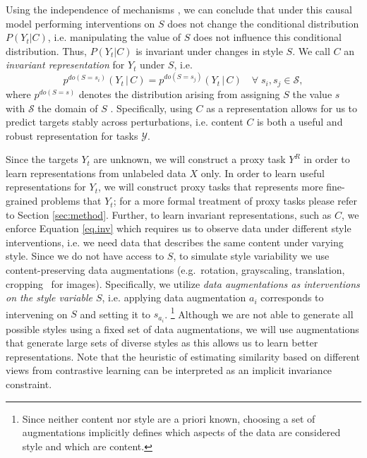 \documentclass{article}
\begin{document}
Using the independence of mechanisms \citep{peters2017elements}, we can conclude that under this causal model performing interventions on $S$ does not change the conditional distribution $P(Y_t\vert C)$, 
i.e. manipulating the value of $S$ does not influence this conditional distribution.
Thus, $P(Y_t\vert C)$ is invariant under changes in style $S$.
We call $C$ an \emph{invariant representation} for $Y_{t}$ under $S$, i.e.
\begin{equation}
    p^{do(S = s_{i})}(Y_{t}\,\vert\,C) = p^{do(S = s_{j})}(Y_{t}\,\vert\,C) \quad \forall \; s_{i}, s_{j}\in\mathcal{S}, \label{eq.inv}
\end{equation}
where $p^{do(S=s)}$ denotes the distribution arising from assigning $S$ the value $s$ with $\mathcal{S}$ the domain of $S$ \citep{pearl2009causality}.
Specifically, using $C$ as a representation allows for us to predict targets stably across perturbations, i.e. content $C$ is both a useful and robust representation for tasks $\mathcal{Y}$.

Since the targets $Y_{t}$ are unknown, we will construct a proxy task $Y^{R}$ in order to learn representations from unlabeled data $X$ only.
In order to learn useful representations for $Y_{t}$, we will construct proxy tasks that represents more fine-grained problems that $Y_{t}$; for a more formal treatment of proxy tasks please refer to Section \ref{sec:method}.
Further, to learn invariant representations, such as $C$, we enforce Equation \ref{eq.inv} which requires us to observe data under different style interventions, i.e. we need data that describes the same content under varying style. 
Since we do not have access to $S$, to simulate style variability we use content-preserving data augmentations  (e.g.\ rotation, grayscaling, translation, cropping \ for images).
Specifically, we utilize \emph{data augmentations as interventions on the style variable $S$}, i.e. applying data augmentation $a_{i}$ corresponds to intervening on $S$ and setting it to $s_{a_{i}}$. \footnote{Since neither content nor style are a priori known, choosing a set of augmentations implicitly defines which aspects of the data are considered style and which are content.}
Although we are not able to generate all possible styles using a fixed set of data augmentations, we will use augmentations that generate large sets of diverse styles as this allows us to learn better representations. 
Note that the heuristic of estimating similarity based on different views from contrastive learning can be interpreted as an implicit invariance constraint.
\end{document}
